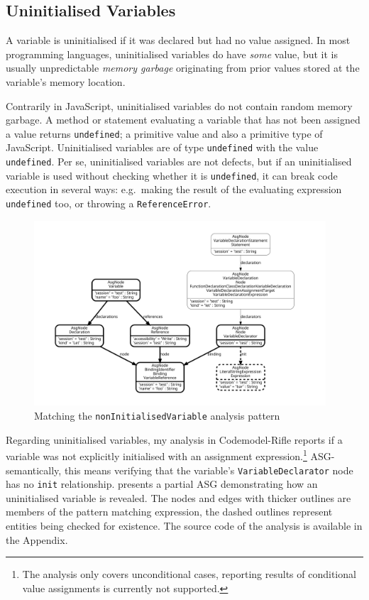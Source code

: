 \subsection{Uninitialised Variables}

A variable is uninitialised if it was declared but had no value assigned. In most programming languages, uninitialised variables do have \emph{some} value, but it is usually unpredictable \emph{memory garbage} originating from prior values stored at the variable's memory location.

Contrarily in JavaScript, uninitialised variables do not contain random memory garbage. A method or statement evaluating a variable that has not been assigned a value returns \lstinline{undefined}; a primitive value and also a primitive type of JavaScript. Uninitialised variables are of type \lstinline{undefined} with the value \lstinline{undefined}. Per se, uninitialised variables are not defects, but if an uninitialised variable is used without checking whether it is \lstinline{undefined}, it can break code execution in several ways: e.g.\ making the result of the evaluating expression \lstinline{undefined} too, or throwing a \lstinline{ReferenceError}.

\begin{figure}[!htb]
	\centering
	\includegraphics[height=69mm, trim=12mm 12mm 12mm 12mm,clip]{figures/analysis_nonInitializedVariable.pdf}
	\caption{Matching the \lstinline{nonInitialisedVariable} analysis pattern}
	\label{fig:analysis-noninitialisedvariable}
\end{figure}

Regarding uninitialised variables, my analysis in Codemodel-Rifle reports if a variable was not explicitly initialised with an assignment expression.\footnote{The analysis only covers unconditional cases, reporting results of conditional value assignments is currently not supported.} ASG-semantically, this means verifying that the variable's \lstinline{VariableDeclarator} node has no \lstinline{init} relationship.  presents a partial ASG demonstrating how an uninitialised variable is revealed. The nodes and edges with thicker outlines are members of the pattern matching expression, the dashed outlines represent entities being checked for existence. The source code of the analysis is available in the Appendix.


